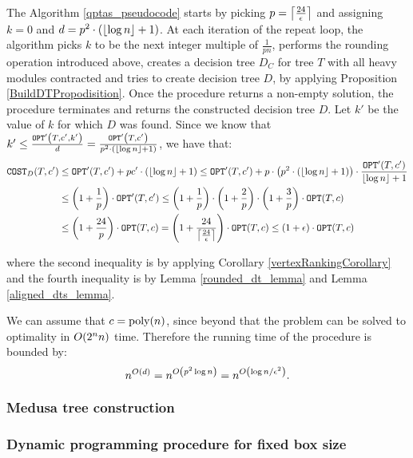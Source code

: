 The Algorithm \ref{qptas_pseudocode} starts by picking $p=\mathopen{}\left\lceil \frac{24}{\epsilon} \right\rceil$ and assigning $k=0$ and $d=p^2\cdot\mathopen{}\left( \mathopen{}\left\lfloor \log n \right\rfloor+1 \right)$. At each iteration of the repeat loop, the algorithm picks $k$ to be the next 
integer multiple of $\frac{1}{pn}$, performs the rounding operation introduced above, creates a decision tree $D_C$ for tree $T$ with all heavy modules contracted and tries to create decision tree $D$, by applying Proposition \ref{BuildDTPropodisition}. Once the \FBuildDt procedure returns a non-empty solution, the \FQPTAS procedure terminates and returns the constructed decision tree $D$. Let $k'$ be the value of $k$ for which $D$ was found. Since we know that $k'\leq \frac{\texttt{OPT}'\mathopen{}\left( T,c',k' \right)}{d}=\frac{\texttt{OPT}'\mathopen{}\left( T,c' \right)}{p^2\cdot\mathopen{}\left( \mathopen{}\left\lfloor \log n \right\rfloor+1 \right)}$, we have that:
\begin{align*}
    \texttt{COST}_{D}\mathopen{}\left( T,c' \right)&\leq \texttt{OPT}'\mathopen{}\left( T,c' \right)+pc'\cdot \mathopen{}\left( \mathopen{}\left\lfloor \log n \right\rfloor+1 \right)\leq \texttt{OPT}'\mathopen{}\left( T,c' \right)+p\cdot \mathopen{}\left( p^2\cdot\mathopen{}\left( \mathopen{}\left\lfloor \log n \right\rfloor+1 \right) \right)\cdot \frac{\texttt{OPT}'\mathopen{}\left( T,c' \right)}{\mathopen{}\left\lfloor \log n \right\rfloor+1} \\
    & \leq \mathopen{}\left( 1+\frac{1}{p} \right)\cdot\texttt{OPT}'\mathopen{}\left( T,c' \right)\leq \mathopen{}\left( 1+\frac{1}{p} \right)\cdot\mathopen{}\left( 1+\frac{2}{p} \right)\cdot\mathopen{}\left( 1+\frac{3}{p} \right)\cdot\texttt{OPT}\mathopen{}\left( T,c \right)
    \\&
    \leq \mathopen{}\left( 1+\frac{24}{p} \right)\cdot\texttt{OPT}\mathopen{}\left( T,c \right) = \mathopen{}\left( 1+\frac{24}{\mathopen{}\left\lceil \frac{24}{\epsilon} \right\rceil} \right)\cdot\texttt{OPT}\mathopen{}\left( T,c \right)\leq \mathopen{}\left( 1+\epsilon \right)\cdot \texttt{OPT}\mathopen{}\left( T,c \right)
\end{align*}
    
where the second inequality is by applying Corollary \ref{vertexRankingCorollary} and the fourth inequality is by Lemma \ref{rounded_dt_lemma} and Lemma \ref{aligned_dts_lemma}.

We can assume that $c=\text{poly}\mathopen{}\left( n \right)$, since beyond that the problem can be solved to optimality in $O\mathopen{}\left( 2^nn \right)$ time. Therefore the running time of the procedure is bounded by:
$$
n^{O\mathopen{}\left( d \right)}=n^{O\mathopen{}\left( p^2\log n \right)}=n^{O\mathopen{}\left( \log n/\epsilon^2 \right)}.
$$
\subsubsection{Medusa tree construction}





\subsubsection{Dynamic programming procedure for fixed box size}



